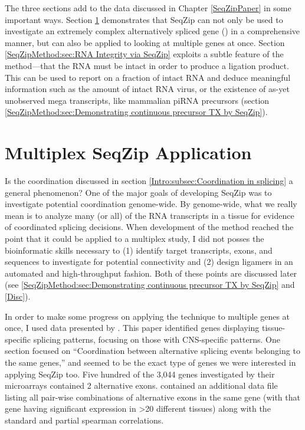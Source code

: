   The three sections add to the data discussed in Chapter \ref{SeqZipPaper} in some important ways. Section \ref{SeqZipMethod:sec:Multiplex Gene Study} demonstrates that SeqZip can not only be used to investigate an extremely complex alternatively spliced gene (\dscam{}) in a comprehensive manner, but can also be applied to looking at multiple genes at once. Section \ref{SeqZipMethod:sec:RNA Integrity via SeqZip} exploits a subtle feature of the method---that the RNA must be intact in order to produce a ligation product. This can be used to report on a fraction of intact RNA and deduce meaningful information such as the amount of intact RNA virus, or the existence of as-yet unobserved mega transcripts, like mammalian piRNA precursors (section \ref{SeqZipMethod:sec:Demonstrating continuous precursor TX by SeqZip}).

\section{Multiplex SeqZip Application}
  \label{SeqZipMethod:sec:Multiplex Gene Study}

  Is the coordination discussed in section \ref{Intro:subsec:Coordination in splicing} a general phenomenon? One of the major goals of developing SeqZip was to investigate potential coordination genome-wide. By genome-wide, what we really mean is to analyze many (or all) of the RNA transcripts in a tissue for evidence of coordinated splicing decisions. When development of the method reached the point that it could be applied to a multiplex study, I did not posses the bioinformatic skills necessary to (1) identify target transcripts, exons, and sequences to investigate for potential connectivity and (2) design ligamers in an automated and high-throughput fashion. Both of these points are discussed later (see \ref{SeqZipMethod:sec:Demonstrating continuous precursor TX by SeqZip} and \ref{Disc}).

  In order to make some progress on applying the technique to multiple genes at once, I used data presented by \citet{Fagnani2007}. This paper identified genes displaying tissue-specific splicing patterns, focusing on those with CNS-specific patterns. One section focused on ``Coordination between alternative splicing events belonging to the same genes,'' and seemed to be the exact type of genes we were interested in applying SeqZip too. Five hundred of the 3,044 genes investigated by their microarrays contained 2 alternative exons. \citet{Fagnani2007} contained an additional data file listing all pair-wise combinations of alternative exons in the same gene (with that gene having significant expression in >20 different tissues) along with the standard and partial spearman correlations. 

